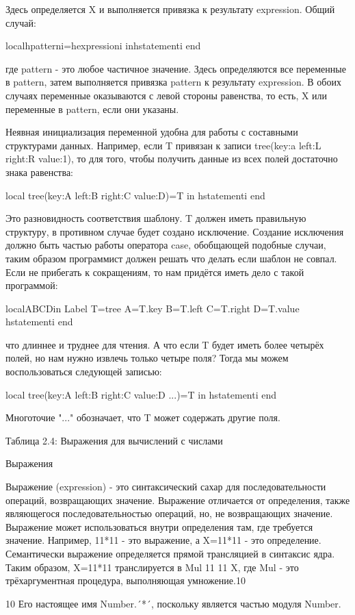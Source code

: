 Здесь определяется X и выполняется привязка к результату expression. Общий случай:

localhpatterni=hexpressioni inhstatementi end

где pattern - это любое частичное значение. Здесь определяются все переменные в pattern, затем выполняется привязка pattern к результату expression. В обоих случаях переменные оказываются с левой стороны равенства, то есть, X или переменные в pattern, если они указаны.

Неявная инициализация переменной удобна для работы с составными структурами данных. Например, если T привязан к записи  tree(key:a left:L right:R value:1), то для того, чтобы получить данные из всех полей достаточно знака равенства:

local
tree(key:A left:B right:C value:D)=T
in
hstatementi
end

Это разновидность соответствия шаблону. T должен иметь правильную структуру, в противном случае будет создано исключение. Создание исключения должно быть частью работы оператора case, обобщающей подобные случаи, таким образом программист должен решать что делать если шаблон не совпал. Если не прибегать к сокращениям, то нам придётся иметь дело с такой программой:

localABCDin
{Label T}=tree
A=T.key
B=T.left
C=T.right
D=T.value
hstatementi
end

что длиннее и труднее для чтения. А что если T будет иметь более четырёх полей, но нам нужно извлечь только четыре поля? Тогда мы можем воспользоваться следующей записью:

local
tree(key:A left:B right:C value:D ...)=T
in
hstatementi
end

Многоточие "..." обозначает, что T может содержать другие поля.

Таблица 2.4: Выражения для вычислений с числами

Выражения

Выражение (expression) - это синтаксический сахар для последовательности операций, возвращающих значение. Выражение отличается от определения, также являющегося последовательностью операций, но, не возвращающих значение. Выражение может использоваться внутри определения там, где требуется значение. Например, 11*11 - это выражение, а X=11*11 - это определение. Семантически выражение определяется прямой трансляцией в синтаксис ядра. Таким образом, X=11*11 транслируется в {Mul 11 11 X}, где Mul - это трёхаргументная процедура, выполняющая умножение.10

10 Его настоящее имя Number.´*´, поскольку является частью модуля Number.

